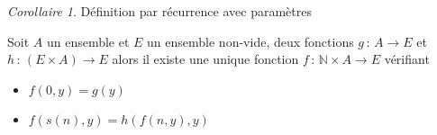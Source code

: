 \documentclass[]{article}
\theoremstyle{remark}
\newtheorem{mycor}{Corollaire}
\theoremstyle{definition}
\newcommand{\funcshort}[3]{
	#1 \, : \, #2 \longrightarrow #3
}
\begin{document}
\begin{mycor} Définition par récurrence avec paramètres
	
	Soit $A$ un ensemble et $E$ un ensemble non-vide, deux fonctions $\funcshort{g}{A}{E}$ et $\funcshort{h}{(E \times A)}{E}$ alors il existe une unique fonction $\funcshort{f}{\mathbb{N} \times A}{E}$ vérifiant
	\begin{itemize}
		\item $f(0, y) = g(y)$
		\item $f(s(n), y) = h(f(n, y), y)$
	\end{itemize}
\end{mycor}
\end{document}
